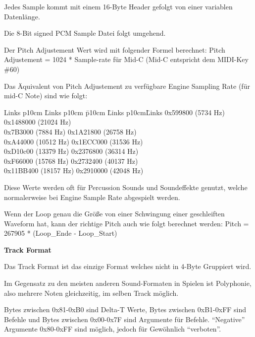 \documentclass[11pt,a4paper]{scrartcl}
\begin{document}
Jedes Sample kommt mit einem 16-Byte Header gefolgt von einer variablen Datenl\"{a}nge.

Die 8-Bit signed PCM Sample Datei folgt umgehend.

Der Pitch Adjustement Wert wird mit folgender Formel berechnet:\newline
Pitch Adjustement = 1024 * Sample-rate f\"{u}r Mid-C (Mid-C entspricht dem MIDI-Key \#60)

Das \"{A}quivalent von Pitch Adjustement zu verf\"{u}gbare Engine Sampling Rate (f\"{u}r mid-C Note) sind wie folgt:

\begin{tabbing}
    Links p{10cm} \= Links p{10cm} \=p{10cm} \= Links p{10cm}\= Links \kill
		0x599800  \>(5734 Hz) \>\>0x1488000 \>(21024 Hz)\\
		0x7B3000  \>(7884 Hz)  \>\>0x1A21800 \>(26758 Hz)\\
		0xA44000  \>(10512 Hz)  \>\>0x1ECC000 \>(31536 Hz)\\
		0xD10c00  \>(13379 Hz)  \>\>0x2376800 \>(36314 Hz)\\
		0xF66000  \>(15768 Hz)  \>\>0x2732400 \>(40137 Hz)\\
		0x11BB400 \>(18157 Hz)  \>\>0x2910000 \>(42048 Hz)\\
\end{tabbing}
\vspace{-15pt}
Diese Werte werden oft f\"{u}r Percussion Sounds und Soundeffekte genutzt, welche normalerweise bei Engine Sample Rate abgespielt werden.

Wenn der Loop genau die Gr\"{o}{\ss}e von einer Schwingung einer geschleiften Waveform hat, kann der richtige Pitch auch wie folgt berechnet werden:\newline
Pitch = 267905 * (Loop\_Ende - Loop\_Start)

\vspace{15pt}
\textbf{{\large Track Format}}

Das Track Format ist das einzige Format welches nicht in 4-Byte Gruppiert wird.

Im Gegensatz zu den meisten anderen Sound-Formaten in Spielen ist Polyphonie, also mehrere Noten gleichzeitig, im selben Track m\"{o}glich.

Bytes zwischen 0x81-0xB0 sind Delta-T Werte, Bytes zwischen 0xB1-0xFF sind Befehle und Bytes zwischen 0x00-0x7F sind Argumente f\"{u}r Befehle.
"`Negative"' Argumente 0x80-0xFF sind m\"{o}glich, jedoch f\"{u}r Gew\"{o}hnlich "`verboten"'.
\end{document}
